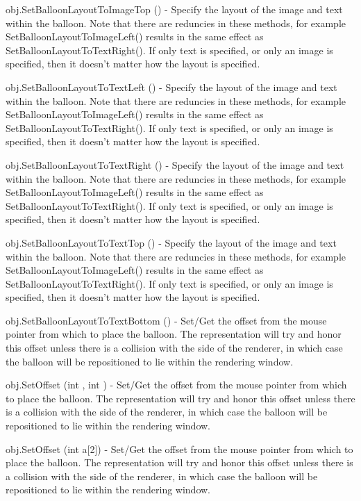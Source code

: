 \begin{DoxyItemize}
\item {\ttfamily obj.\-Set\-Balloon\-Layout\-To\-Image\-Top ()} -\/ Specify the layout of the image and text within the balloon. Note that there are reduncies in these methods, for example Set\-Balloon\-Layout\-To\-Image\-Left() results in the same effect as Set\-Balloon\-Layout\-To\-Text\-Right(). If only text is specified, or only an image is specified, then it doesn't matter how the layout is specified.  
\item {\ttfamily obj.\-Set\-Balloon\-Layout\-To\-Text\-Left ()} -\/ Specify the layout of the image and text within the balloon. Note that there are reduncies in these methods, for example Set\-Balloon\-Layout\-To\-Image\-Left() results in the same effect as Set\-Balloon\-Layout\-To\-Text\-Right(). If only text is specified, or only an image is specified, then it doesn't matter how the layout is specified.  
\item {\ttfamily obj.\-Set\-Balloon\-Layout\-To\-Text\-Right ()} -\/ Specify the layout of the image and text within the balloon. Note that there are reduncies in these methods, for example Set\-Balloon\-Layout\-To\-Image\-Left() results in the same effect as Set\-Balloon\-Layout\-To\-Text\-Right(). If only text is specified, or only an image is specified, then it doesn't matter how the layout is specified.  
\item {\ttfamily obj.\-Set\-Balloon\-Layout\-To\-Text\-Top ()} -\/ Specify the layout of the image and text within the balloon. Note that there are reduncies in these methods, for example Set\-Balloon\-Layout\-To\-Image\-Left() results in the same effect as Set\-Balloon\-Layout\-To\-Text\-Right(). If only text is specified, or only an image is specified, then it doesn't matter how the layout is specified.  
\item {\ttfamily obj.\-Set\-Balloon\-Layout\-To\-Text\-Bottom ()} -\/ Set/\-Get the offset from the mouse pointer from which to place the balloon. The representation will try and honor this offset unless there is a collision with the side of the renderer, in which case the balloon will be repositioned to lie within the rendering window.  
\item {\ttfamily obj.\-Set\-Offset (int , int )} -\/ Set/\-Get the offset from the mouse pointer from which to place the balloon. The representation will try and honor this offset unless there is a collision with the side of the renderer, in which case the balloon will be repositioned to lie within the rendering window.  
\item {\ttfamily obj.\-Set\-Offset (int a\mbox{[}2\mbox{]})} -\/ Set/\-Get the offset from the mouse pointer from which to place the balloon. The representation will try and honor this offset unless there is a collision with the side of the renderer, in which case the balloon will be repositioned to lie within the rendering window.  

\end{DoxyItemize}
